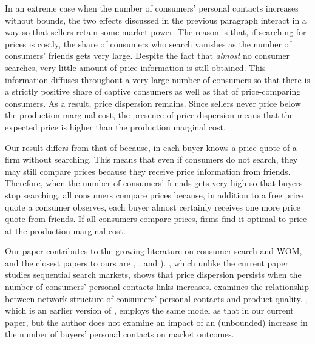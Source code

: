 \documentclass[12pt]{article}
\begin{document}
In an extreme case when the number of consumers' personal 
contacts increases without bounds, the two effects discussed in 
the previous paragraph interact in a way so that sellers retain 
some market power.  The reason is that, if searching for prices 
is costly, the share of consumers who search vanishes as the 
number of consumers' friends gets very large.  Despite the fact 
that \textit{almost} no consumer searches, very little amount of 
price information is still obtained.  This information diffuses 
throughout a very large number of consumers so that there is a 
strictly positive share of captive consumers as well as that of 
price-comparing consumers.  As a result, price dispersion 
remains. Since sellers never price below the production marginal 
cost, the presence of price dispersion means that the expected 
price is higher than the production marginal cost.


Our result differs from that of \cite{galeotti2010} because, in 
\cite{galeotti2010} each buyer knows a price quote of a firm 
without searching.  This means that even if consumers do not 
search, they may still compare prices because they receive price 
information from friends.  Therefore, when the number of 
consumers' friends gets very high so that buyers stop searching, 
all consumers compare prices because, in addition to a free 
price quote a consumer observes, each buyer almost certainly 
receives one more price quote from friends.  If all 
consumers compare prices, firms find it optimal to price at the 
production marginal cost.

Our paper contributes to the growing literature on consumer 
search and WOM, and the closest papers to ours are 
\cite{atayevjanssen2019}, \cite{campbelletal2020}, and 
\cite{galeotti2004}).   \cite{atayevjanssen2019}, 
which unlike the current paper studies sequential search 
markets, shows that price dispersion persists when the number of 
consumers' personal contacts links increases. 
\cite{campbelletal2020} examines the relationship between 
network structure of consumers' personal contacts and product 
quality.  \cite{galeotti2004}, which is an earlier 
version of \cite{galeotti2010}, employs the same model as that 
in our current paper, but the author does not examine an impact 
of an (unbounded) increase in the number of buyers' personal 
contacts on market outcomes.  

\end{document}
